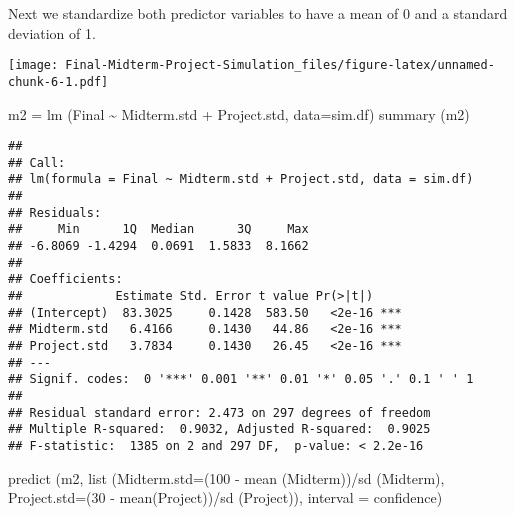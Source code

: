 \documentclass[
]{article}
\newenvironment{Shaded}{\begin{snugshade}}{\end{snugshade}}
\newcommand{\AttributeTok}[1]{\textcolor[rgb]{0.77,0.63,0.00}{#1}}
\newcommand{\DecValTok}[1]{\textcolor[rgb]{0.00,0.00,0.81}{#1}}
\newcommand{\FunctionTok}[1]{\textcolor[rgb]{0.00,0.00,0.00}{#1}}
\newcommand{\NormalTok}[1]{#1}
\newcommand{\OtherTok}[1]{\textcolor[rgb]{0.56,0.35,0.01}{#1}}
\newcommand{\SpecialCharTok}[1]{\textcolor[rgb]{0.00,0.00,0.00}{#1}}
\newcommand{\StringTok}[1]{\textcolor[rgb]{0.31,0.60,0.02}{#1}}
\begin{document}
Next we standardize both predictor variables to have a mean of 0 and a
standard deviation of 1.

\begin{Shaded}
\end{Shaded}

\texttt{[image: Final-Midterm-Project-Simulation\_files/figure-latex/unnamed-chunk-6-1.pdf]}

\begin{Shaded}
\begin{Highlighting}[]
\NormalTok{m2 }\OtherTok{=} \FunctionTok{lm}\NormalTok{ (Final }\SpecialCharTok{\textasciitilde{}}\NormalTok{ Midterm.std }\SpecialCharTok{+}\NormalTok{ Project.std, }\AttributeTok{data=}\NormalTok{sim.df)}
\FunctionTok{summary}\NormalTok{ (m2)}
\end{Highlighting}
\end{Shaded}

\begin{verbatim}
## 
## Call:
## lm(formula = Final ~ Midterm.std + Project.std, data = sim.df)
## 
## Residuals:
##     Min      1Q  Median      3Q     Max 
## -6.8069 -1.4294  0.0691  1.5833  8.1662 
## 
## Coefficients:
##             Estimate Std. Error t value Pr(>|t|)    
## (Intercept)  83.3025     0.1428  583.50   <2e-16 ***
## Midterm.std   6.4166     0.1430   44.86   <2e-16 ***
## Project.std   3.7834     0.1430   26.45   <2e-16 ***
## ---
## Signif. codes:  0 '***' 0.001 '**' 0.01 '*' 0.05 '.' 0.1 ' ' 1
## 
## Residual standard error: 2.473 on 297 degrees of freedom
## Multiple R-squared:  0.9032, Adjusted R-squared:  0.9025 
## F-statistic:  1385 on 2 and 297 DF,  p-value: < 2.2e-16
\end{verbatim}

\begin{Shaded}
\begin{Highlighting}[]
\FunctionTok{predict}\NormalTok{ (m2, }\FunctionTok{list}\NormalTok{ (}\AttributeTok{Midterm.std=}\NormalTok{(}\DecValTok{100} \SpecialCharTok{{-}} \FunctionTok{mean}\NormalTok{ (Midterm))}\SpecialCharTok{/}\FunctionTok{sd}\NormalTok{ (Midterm), }
                   \AttributeTok{Project.std=}\NormalTok{(}\DecValTok{30} \SpecialCharTok{{-}} \FunctionTok{mean}\NormalTok{(Project))}\SpecialCharTok{/}\FunctionTok{sd}\NormalTok{ (Project)), }\AttributeTok{interval =} \StringTok{\textquotesingle{}confidence\textquotesingle{}}\NormalTok{)}
\end{Highlighting}
\end{Shaded}
\end{document}
